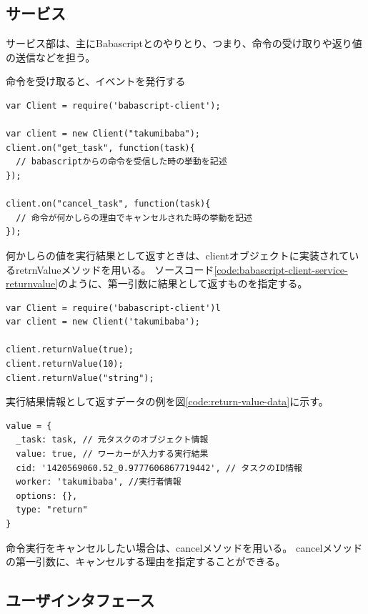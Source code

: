 \subsection{サービス}\label{ux30b5ux30fcux30d3ux30b9}

サービス部は、主にBabascriptとのやりとり、つまり、命令の受け取りや返り値の送信などを担う。

命令を受け取ると、イベントを発行する

\begin{lstlisting}[caption=Babascript Agent サービス部のソースコード例, label=code:babascript-client-service]
var Client = require('babascript-client');

var client = new Client("takumibaba");
client.on("get_task", function(task){
  // babascriptからの命令を受信した時の挙動を記述
});

client.on("cancel_task", function(task){
  // 命令が何かしらの理由でキャンセルされた時の挙動を記述
});
\end{lstlisting}

何かしらの値を実行結果として返すときは、clientオブジェクトに実装されているretrnValueメソッドを用いる。
ソースコード\ref{code:babascript-client-service-returnvalue}のように、第一引数に結果として返すものを指定する。

\begin{lstlisting}[caption=Babascript Agent 処理結果を返すメソッドの例, label=code:babascript-client-service-returnvalue]
var Client = require('babascript-client')l
var client = new Client('takumibaba');

client.returnValue(true);
client.returnValue(10);
client.returnValue("string");
\end{lstlisting}

実行結果情報として返すデータの例を図\ref{code:return-value-data}に示す。

\begin{lstlisting}[caption=タスク情報, label=code:return-value-data]
value = {
  _task: task, // 元タスクのオブジェクト情報
  value: true, // ワーカーが入力する実行結果
  cid: '1420569060.52_0.9777606867719442', // タスクのID情報
  worker: 'takumibaba', //実行者情報
  options: {},
  type: "return"
}
\end{lstlisting}

命令実行をキャンセルしたい場合は、cancelメソッドを用いる。
cancelメソッドの第一引数に、キャンセルする理由を指定することができる。

\subsection{ユーザインタフェース}\label{ux30e6ux30fcux30b6ux30a4ux30f3ux30bfux30d5ux30a7ux30fcux30b9}

